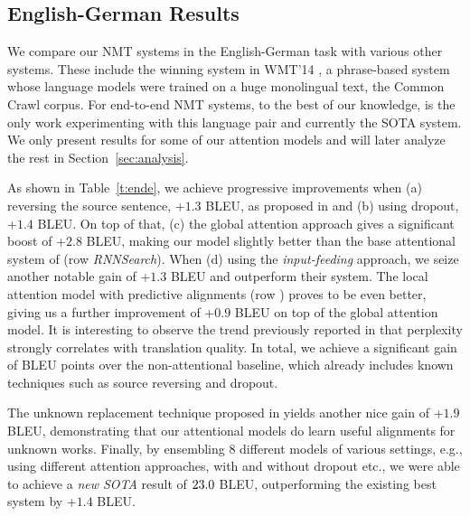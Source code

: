 \subsection{English-German Results}
We compare our NMT systems in the English-German task with various other
systems. These include the winning system in WMT'14
\cite{buck14}, a phrase-based system whose language models were trained on a
huge monolingual text, the Common Crawl corpus. For end-to-end NMT systems, to the best of our knowledge, \cite{jean15} is the only work experimenting with this language pair and currently the SOTA system.
We only present results for some of our attention models and will later
analyze the rest in Section~\ref{sec:analysis}. 

As shown in Table~\ref{t:ende}, we achieve progressive improvements when
(a) reversing the source sentence, +$1.3$ BLEU, as proposed in \cite{sutskever14}
and (b) using dropout, +$1.4$ BLEU. On top of that, (c) the global
attention approach gives a significant boost of +$2.8$ BLEU, making 
 our model slightly better than the base attentional system of
  (row {\it RNNSearch}). When (d) using the {\it input-feeding}
approach, we seize another notable gain of +$1.3$ BLEU and outperform their
system. The local attention model with predictive alignments (row {\it \localp}) proves
to be even better, giving us a further improvement of +$0.9$ BLEU on top of the
global attention model. 
It is interesting to observe the trend previously reported in
\cite{luong15} that perplexity strongly correlates with translation quality.
In total, we achieve a significant gain of
\attngain{} BLEU points over the non-attentional baseline, which already includes
known techniques such as source reversing and dropout.

The unknown replacement technique proposed in \cite{luong15,jean15} yields another nice
gain of +$1.9$ BLEU, demonstrating that our attentional models
do learn useful alignments for unknown works. Finally, by ensembling 8 different
models of various settings, e.g., using different attention approaches, with
and without dropout etc., we were able to achieve a {\it new SOTA} result of
$23.0{}$
BLEU, outperforming the existing best system \cite{jean15} by +$1.4$ BLEU.

\begin{table}[tbh!]
\centering
{}
\caption{{\bf WMT'15 English-German results} -- {\it NIST} BLEU scores of the
winning entry in WMT'15 and our best one on newstest2015.}
\label{t:wmt15ende}
\end{table}

